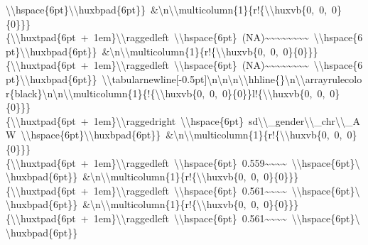 \documentclass[
  english,
  man]{apa6}
\begin{document}
\textbackslash{}\textbackslash{}hspace\{6pt\}\textbackslash{}\textbackslash{}huxbpad\{6pt\}\}\ \&\textbackslash{}n\textbackslash{}\textbackslash{}multicolumn\{1\}\{r!\{\textbackslash{}\textbackslash{}huxvb\{0,\ 0,\ 0\}\{0\}\}\}\{\textbackslash{}\textbackslash{}huxtpad\{6pt\ +\ 1em\}\textbackslash{}\textbackslash{}raggedleft\ \textbackslash{}\textbackslash{}hspace\{6pt\}\ (NA)\textasciitilde{}\textasciitilde{}\textasciitilde{}\textasciitilde{}\textasciitilde{}\textasciitilde{}\textasciitilde{}\textasciitilde{}\ \textbackslash{}\textbackslash{}hspace\{6pt\}\textbackslash{}\textbackslash{}huxbpad\{6pt\}\}\ \&\textbackslash{}n\textbackslash{}\textbackslash{}multicolumn\{1\}\{r!\{\textbackslash{}\textbackslash{}huxvb\{0,\ 0,\ 0\}\{0\}\}\}\{\textbackslash{}\textbackslash{}huxtpad\{6pt\ +\ 1em\}\textbackslash{}\textbackslash{}raggedleft\ \textbackslash{}\textbackslash{}hspace\{6pt\}\ (NA)\textasciitilde{}\textasciitilde{}\textasciitilde{}\textasciitilde{}\textasciitilde{}\textasciitilde{}\textasciitilde{}\textasciitilde{}\ \textbackslash{}\textbackslash{}hspace\{6pt\}\textbackslash{}\textbackslash{}huxbpad\{6pt\}\}\ \textbackslash{}\textbackslash{}tabularnewline{[}-0.5pt{]}\textbackslash{}n\textbackslash{}n\textbackslash{}n\textbackslash{}\textbackslash{}hhline\{\}\textbackslash{}n\textbackslash{}\textbackslash{}arrayrulecolor\{black\}\textbackslash{}n\textbackslash{}n\textbackslash{}\textbackslash{}multicolumn\{1\}\{!\{\textbackslash{}\textbackslash{}huxvb\{0,\ 0,\ 0\}\{0\}\}l!\{\textbackslash{}\textbackslash{}huxvb\{0,\ 0,\ 0\}\{0\}\}\}\{\textbackslash{}\textbackslash{}huxtpad\{6pt\ +\ 1em\}\textbackslash{}\textbackslash{}raggedright\ \textbackslash{}\textbackslash{}hspace\{6pt\}\ sd\textbackslash{}\textbackslash{}\_gender\textbackslash{}\textbackslash{}\_chr\textbackslash{}\textbackslash{}\_AW\ \textbackslash{}\textbackslash{}hspace\{6pt\}\textbackslash{}\textbackslash{}huxbpad\{6pt\}\}\ \&\textbackslash{}n\textbackslash{}\textbackslash{}multicolumn\{1\}\{r!\{\textbackslash{}\textbackslash{}huxvb\{0,\ 0,\ 0\}\{0\}\}\}\{\textbackslash{}\textbackslash{}huxtpad\{6pt\ +\ 1em\}\textbackslash{}\textbackslash{}raggedleft\ \textbackslash{}\textbackslash{}hspace\{6pt\}\ 0.559\textasciitilde{}\textasciitilde{}\textasciitilde{}\textasciitilde{}\ \textbackslash{}\textbackslash{}hspace\{6pt\}\textbackslash{}\textbackslash{}huxbpad\{6pt\}\}\ \&\textbackslash{}n\textbackslash{}\textbackslash{}multicolumn\{1\}\{r!\{\textbackslash{}\textbackslash{}huxvb\{0,\ 0,\ 0\}\{0\}\}\}\{\textbackslash{}\textbackslash{}huxtpad\{6pt\ +\ 1em\}\textbackslash{}\textbackslash{}raggedleft\ \textbackslash{}\textbackslash{}hspace\{6pt\}\ 0.561\textasciitilde{}\textasciitilde{}\textasciitilde{}\textasciitilde{}\ \textbackslash{}\textbackslash{}hspace\{6pt\}\textbackslash{}\textbackslash{}huxbpad\{6pt\}\}\ \&\textbackslash{}n\textbackslash{}\textbackslash{}multicolumn\{1\}\{r!\{\textbackslash{}\textbackslash{}huxvb\{0,\ 0,\ 0\}\{0\}\}\}\{\textbackslash{}\textbackslash{}huxtpad\{6pt\ +\ 1em\}\textbackslash{}\textbackslash{}raggedleft\ \textbackslash{}\textbackslash{}hspace\{6pt\}\ 0.561\textasciitilde{}\textasciitilde{}\textasciitilde{}\textasciitilde{}\ \textbackslash{}\textbackslash{}hspace\{6pt\}\textbackslash{}\textbackslash{}huxbpad\{6pt\}\}\ 
\end{document}
